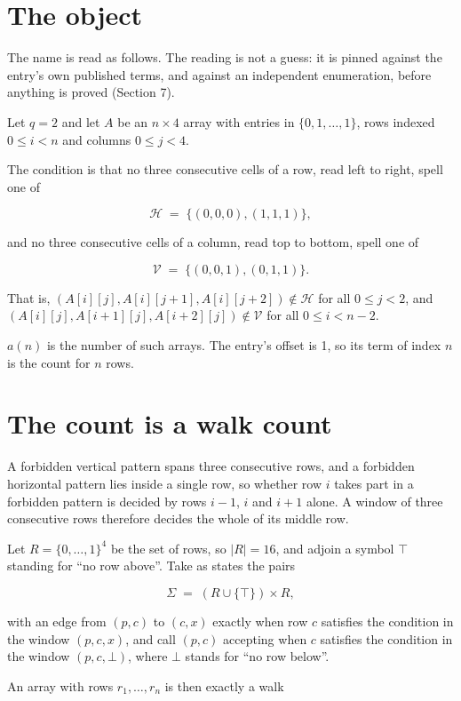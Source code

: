 \documentclass[11pt]{article}
\theoremstyle{definition}
\begin{document}
\section{The object}

The name is read as follows. The reading is not a guess: it is pinned against the entry's own published terms, and against an independent enumeration, before anything is proved (Section 7).

Let $q = 2$ and let $A$ be an $n \times 4$ array with entries in $\{0,1,\dots,1\}$, rows indexed $0 \le i < n$ and columns $0 \le j < 4$.

The condition is that no three consecutive cells of a row, read left to right, spell one of

\[\mathcal{H} \;=\; \{(0,0,0), (1,1,1)\},\]

and no three consecutive cells of a column, read top to bottom, spell one of

\[\mathcal{V} \;=\; \{(0,0,1), (0,1,1)\}.\]

That is, $(A[i][j],A[i][j{+}1],A[i][j{+}2]) \notin \mathcal{H}$ for all $0 \le j < 2$, and $(A[i][j],A[i{+}1][j],A[i{+}2][j]) \notin \mathcal{V}$ for all $0 \le i < n-2$.

$a(n)$ is the number of such arrays. The entry's offset is 1, so its term of index $n$ is the count for $n$ rows.

\section{The count is a walk count}

A forbidden vertical pattern spans three consecutive rows, and a forbidden horizontal pattern lies inside a single row, so whether row $i$ takes part in a forbidden pattern is decided by rows $i-1$, $i$ and $i+1$ alone. A window of three consecutive rows therefore decides the whole of its middle row.

Let $R = \{0,\dots,1\}^{4}$ be the set of rows, so $|R| = 16$, and adjoin a symbol $\top$ standing for ``no row above''. Take as states the pairs

\[\Sigma \;=\; (R \cup \{\top\}) \times R,\]

with an edge from $(p,c)$ to $(c,x)$ exactly when row $c$ satisfies the condition in the window $(p,c,x)$, and call $(p,c)$ accepting when $c$ satisfies the condition in the window $(p,c,\bot)$, where $\bot$ stands for ``no row below''.

An array with rows $r_1,\dots,r_n$ is then exactly a walk
\end{document}
